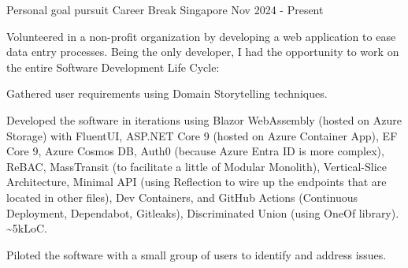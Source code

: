 
\begin{cventries}

\cventry
{Personal goal pursuit} %
{Career Break} %
{Singapore} %
{Nov 2024 - Present} %
{
  \begin{cvitems} %
    \item {Volunteered in a non-profit organization by developing a web application to ease data entry processes. Being the only developer, I had the opportunity to work on the entire Software Development Life Cycle:}
    \item {Gathered user requirements using Domain Storytelling techniques.}
    \item {Developed the software in iterations using Blazor WebAssembly (hosted on Azure Storage) with FluentUI, ASP.NET Core 9 (hosted on Azure Container App), EF Core 9, Azure Cosmos DB, Auth0 (because Azure Entra ID is more complex), ReBAC, MassTransit (to facilitate a little of Modular Monolith), Vertical-Slice Architecture, Minimal API (using Reflection to wire up the endpoints that are located in other files), Dev Containers, and GitHub Actions (Continuous Deployment, Dependabot, Gitleaks), Discriminated Union (using OneOf library). \textasciitilde5kLoC.}
    \item {Piloted the software with a small group of users to identify and address issues.}
  \end{cvitems}
}


\end{cventries}
